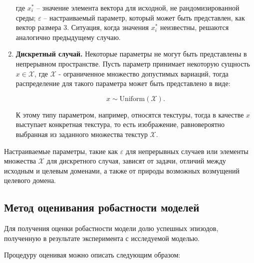 \begin{enumerate}
            где $x_i^*$ -- значение элемента вектора для исходной, не рандомизированной среды; $\varepsilon$ --  настраиваемый параметр, который может быть представлен, как вектор размера 3. Ситуация, когда значения $x_i^*$ неизвестны, решаются аналогично предыдущему случаю.
 
            \item \textbf{Дискретный случай.} Некоторые параметры не могут быть представлены в непрерывном пространстве. Пусть параметр принимает некоторую сущность $x \in \mathcal{X}$, где $\mathcal{X}$ - ограниченное множество допустимых вариаций, тогда распределение для такого параметра может быть представлено в виде:
            
            \begin{equation}
                x \sim \mathrm{Uniform}(\mathcal{X}).
            \end{equation}

            К этому типу параметром, например, относятся текстуры, тогда в качестве $x$ выступает конкретная текстура, то есть изображение, равновероятно выбранная из заданного множества текстур $\mathcal{X}$. 
            
        \end{enumerate}

        Настраиваемые параметры, такие как $\varepsilon$ для непрерывных случаев или элементы множества $\mathcal{X}$ для дискретного случая, зависят от задачи, отличий между исходным и целевым доменами, а также от природы возможных возмущений целевого домена. 
    
        

    \subsection{Метод оценивания робастности моделей}
         \label{method_robust}
        Для получения оценки робастности модели долю успешных эпизодов, полученную в результате эксперимента с исследуемой моделью. 
        
        Процедуру оценивая можно описать следующим образом:

